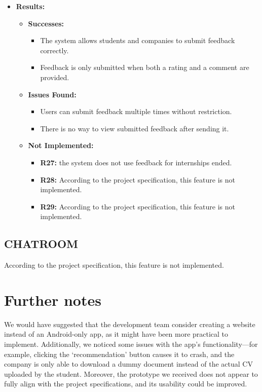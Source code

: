 \begin{itemize}
    \item \textbf{Results:}
    \begin{itemize}
        \item \textbf{Successes:}
        \begin{itemize}
            \item The system allows students and companies to submit feedback correctly.
            \item Feedback is only submitted when both a rating and a comment are provided.
        \end{itemize}
        \item \textbf{Issues Found:}
        \begin{itemize}
            \item Users can submit feedback multiple times without restriction.
            \item There is no way to view submitted feedback after sending it.
        \end{itemize}
        \item \textbf{Not Implemented:}
        \begin{itemize}
            \item \textbf{R27:} the system does not use feedback for internships ended.
            \item \textbf{R28:} According to the project specification, this feature is not implemented.
            \item \textbf{R29:} According to the project specification, this feature is not implemented.
        \end{itemize}
    \end{itemize}
\end{itemize}


\subsection{CHATROOM}\label{subsec:chatroom}
According to the project specification, this feature is not implemented.

\newpage
\section{Further notes}\label{sec:further-notes}
We would have suggested that the development team consider creating a website instead of an Android-only app, as it might have been more practical to implement.
Additionally, we noticed some issues with the app’s functionality—for example, clicking the ‘recommendation’ button causes it to crash, and the company is only able to download a dummy document instead of the actual CV uploaded by the student.
Moreover, the prototype we received does not appear to fully align with the project specifications, and its usability could be improved.
